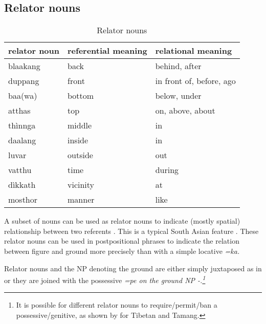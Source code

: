 \subsection{Relator nouns}\label{sec:wc:Relatornouns}
\begin{table}
	\centering
		  \begin{tabular}{lll}
			relator noun & referential meaning & relational meaning\\
\hline
  			blaakang & back & behind, after\\
  			duppang & front & in front of, before, ago\\
			baa(wa)   & bottom & below, under\\
			atthas & top & on, above, about\\
			thìnnga & middle & in\\
			daalang & inside & in\\
			luvar & outside & out\\
			vatthu & time & during\\
			dìkkath & vicinity & at\\
			mosthor & manner & like\\
  		\end{tabular}
 			\caption{Relator nouns}
  		\label{tab:RelatorNouns}
\end{table}

A subset of nouns can be used as relator nouns \citep{Starosta1985, DeLancey1997relator} to indicate (mostly spatial) relationship between two referents  \citep[25]{Adelaar1991}. This is a typical South Asian feature \citep[23]{Masica1976}.
These relator nouns can be used in postpositional phrases to indicate the relation between figure and ground more precisely than with a simple locative \em =ka\em.

Relator nouns and the NP denoting the ground are either simply juxtaposed as in  or they are joined with the possessive \em =pe \em on the ground NP  -\citep[62]{Saldin2001}.\footnote{It is possible for different  relator nouns to require/permit/ban a  possessive/genitive, as shown  by \citet{DeLancey1997relator} for Tibetan and Tamang.}



